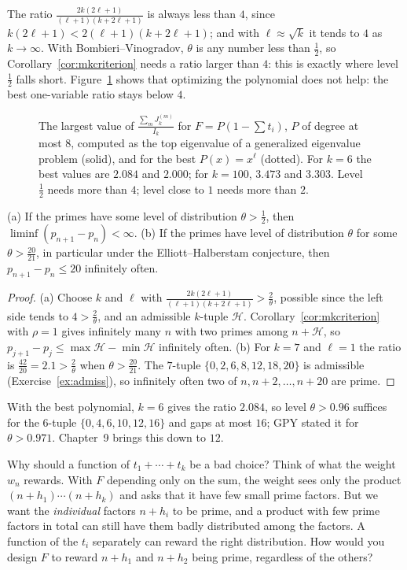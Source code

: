 The ratio $\frac{2k(2\ell+1)}{(\ell+1)(k+2\ell+1)}$ is always less than $4$, since $k(2\ell+1)<2(\ell+1)(k+2\ell+1)$; and with $\ell\approx\sqrt k$ it tends to $4$ as $k\to\infty$. With Bombieri--Vinogradov, $\theta$ is any number less than $\frac12$, so Corollary~\ref{cor:mkcriterion} needs a ratio larger than $4$: this is exactly where level $\frac12$ falls short. Figure~\ref{fig:gpyratio} shows that optimizing the polynomial does not help: the best one-variable ratio stays below $4$.

\begin{figure}[ht]
\centering
{}
\caption{The largest value of $\frac{\sum_mJ^{(m)}_k}{I_k}$ for $F=P(1-\sum t_i)$, $P$ of degree at most $8$, computed as the top eigenvalue of a generalized eigenvalue problem (solid), and for the best $P(x)=x^\ell$ (dotted). For $k=6$ the best values are $2.084$ and $2.000$; for $k=100$, $3.473$ and $3.303$. Level $\frac12$ needs more than $4$; level close to $1$ needs more than $2$.}
\label{fig:gpyratio}
\end{figure}

\begin{theorem}\label{thm:gpy}
(a) If the primes have some level of distribution $\theta>\frac12$, then $\liminf(p_{n+1}-p_n)<\infty$.
(b) If the primes have level of distribution $\theta$ for some $\theta>\frac{20}{21}$, in particular under the Elliott--Halberstam conjecture, then $p_{n+1}-p_n\le20$ infinitely often.
\end{theorem}
\begin{proof}
(a) Choose $k$ and $\ell$ with $\frac{2k(2\ell+1)}{(\ell+1)(k+2\ell+1)}>\frac2\theta$, possible since the left side tends to $4>\frac2\theta$, and an admissible $k$-tuple $\mathcal H$. Corollary~\ref{cor:mkcriterion} with $\rho=1$ gives infinitely many $n$ with two primes among $n+\mathcal H$, so $p_{j+1}-p_j\le\max\mathcal H-\min\mathcal H$ infinitely often.
(b) For $k=7$ and $\ell=1$ the ratio is $\frac{42}{20}=2.1>\frac2\theta$ when $\theta>\frac{20}{21}$. The $7$-tuple $\{0,2,6,8,12,18,20\}$ is admissible (Exercise~\ref{ex:admiss}), so infinitely often two of $n,n+2,\dots,n+20$ are prime.
\end{proof}

With the best polynomial, $k=6$ gives the ratio $2.084$, so level $\theta>0.96$ suffices for the $6$-tuple $\{0,4,6,10,12,16\}$ and gaps at most $16$; GPY stated it for $\theta>0.971$. Chapter~9 brings this down to $12$.

\begin{think}
Why should a function of $t_1+\cdots+t_k$ be a bad choice? Think of what the weight $w_n$ rewards. With $F$ depending only on the sum, the weight sees only the product $(n+h_1)\cdots(n+h_k)$ and asks that it have few small prime factors. But we want the \emph{individual} factors $n+h_i$ to be prime, and a product with few prime factors in total can still have them badly distributed among the factors. A function of the $t_i$ separately can reward the right distribution. How would you design $F$ to reward $n+h_1$ and $n+h_2$ being prime, regardless of the others?
\end{think}

